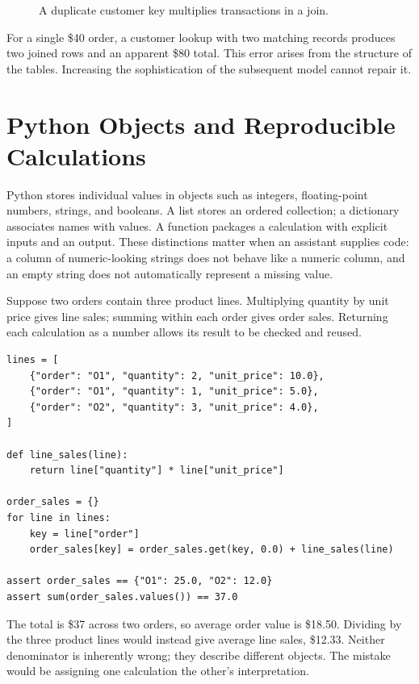 \begin{figure}[htbp]
\centering

\caption{A duplicate customer key multiplies transactions in a join.}\label{fig:M01_join_multiplication}
\end{figure}

For a single \$40 order, a customer lookup with two matching records
produces two joined rows and an apparent \$80 total. This error arises
from the structure of the tables. Increasing the sophistication of the
subsequent model cannot repair it.

\hypertarget{M01-python-objects-and-reproducible-calculations}{%
\section{Python Objects and Reproducible
Calculations}\label{M01-python-objects-and-reproducible-calculations}}

\noindent Python stores individual values in objects such as integers,
floating-point numbers, strings, and booleans. A list stores an ordered
collection; a dictionary associates names with values. A function
packages a calculation with explicit inputs and an output. These
distinctions matter when an assistant supplies code: a column of
numeric-looking strings does not behave like a numeric column, and an
empty string does not automatically represent a missing value.

Suppose two orders contain three product lines. Multiplying quantity by
unit price gives line sales; summing within each order gives order
sales. Returning each calculation as a number allows its result to be
checked and reused.

\begin{Verbatim}[breaklines,breakanywhere,fontsize=\small]
lines = [
    {"order": "O1", "quantity": 2, "unit_price": 10.0},
    {"order": "O1", "quantity": 1, "unit_price": 5.0},
    {"order": "O2", "quantity": 3, "unit_price": 4.0},
]

def line_sales(line):
    return line["quantity"] * line["unit_price"]

order_sales = {}
for line in lines:
    key = line["order"]
    order_sales[key] = order_sales.get(key, 0.0) + line_sales(line)

assert order_sales == {"O1": 25.0, "O2": 12.0}
assert sum(order_sales.values()) == 37.0
\end{Verbatim}

The total is \$37 across two orders, so average order value is \$18.50.
Dividing by the three product lines would instead give average line
sales, \$12.33. Neither denominator is inherently wrong; they describe
different objects. The mistake would be assigning one calculation the
other's interpretation.

